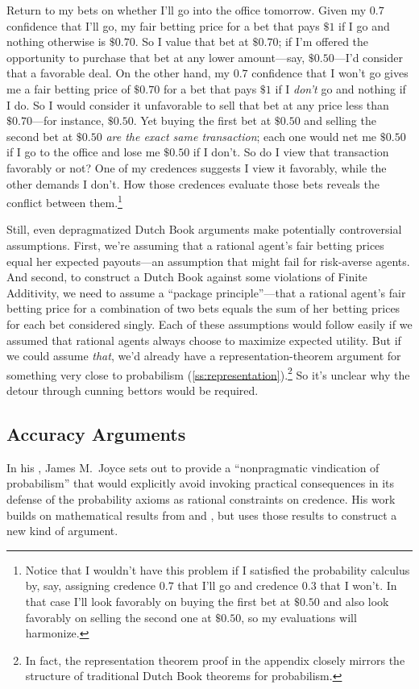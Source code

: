 Return to my bets on whether I'll go into the office tomorrow. Given my $0.7$ confidence that I'll go, my fair betting price for a bet that pays $\$1$ if I go and nothing otherwise is $\$0.70$. So I value that bet at $\$0.70$; if I'm offered the opportunity to purchase that bet at any lower amount---say, $\$0.50$---I'd consider that a favorable deal. On the other hand, my $0.7$ confidence that I won't go gives me a fair betting price of $\$0.70$ for a bet that pays $\$1$ if I \emph{don't} go and nothing if I do. So I would consider it unfavorable to sell that bet at any price less than $\$0.70$---for instance, $\$0.50$. Yet buying the first bet at $\$0.50$ and selling the second bet at $\$0.50$ \emph{are the exact same transaction}; each one would net me $\$0.50$ if I go to the office and lose me $\$0.50$ if I don't. So do I view that transaction favorably or not? One of my credences suggests I view it favorably, while the other demands I don't. How those credences evaluate those bets reveals the conflict between them.\footnote
{Notice that I wouldn't have this problem if I satisfied the probability calculus by, say, assigning credence $0.7$ that I'll go and credence $0.3$ that I won't. In that case I'll look favorably on buying the first bet at $\$0.50$ and also look favorably on selling the second one at $\$0.50$, so my evaluations will harmonize.}

Still, even depragmatized Dutch Book arguments make potentially controversial assumptions. First, we're assuming that a rational agent's fair betting prices equal her expected payouts---an assumption that might fail for risk-averse agents. And second, to construct a Dutch Book against some violations of Finite Additivity, we need to assume a ``package principle''---that a rational agent's fair betting price for a combination of two bets equals the sum of her betting prices for each bet considered singly. Each of these assumptions would follow easily if we assumed that rational agents always choose to maximize expected utility. But if we could assume \emph{that}, we'd already have a representation-theorem argument for something very close to probabilism (\autoref{ss:representation}).\footnote
{In fact, the representation theorem proof in the appendix closely mirrors the structure of traditional Dutch Book theorems for probabilism.} So it's unclear why the detour through cunning bettors would be required.

\subsection{Accuracy Arguments}
In his \citeyear{JoyceNonpragmatic}, James M.\ Joyce sets out to provide a ``nonpragmatic vindication of probabilism'' that would explicitly avoid invoking practical consequences in its defense of the probability axioms as rational constraints on credence. His work builds on mathematical results from \citet{deFinettiTheory} and \citet{RosenkrantzFoundations}, but uses those results to construct a new kind of argument. 

